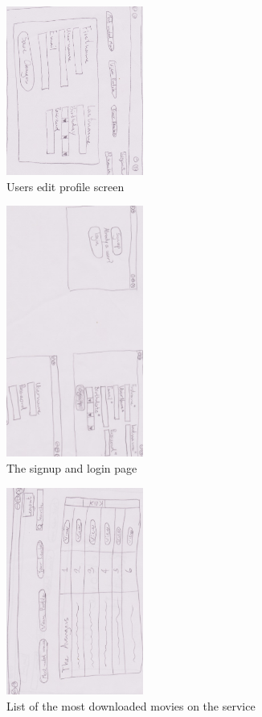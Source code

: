 \begin{figure}[!ht]
  \centering
    \includegraphics[angle=90, width=0.4\textwidth]{Parts/Appendix/Images/PaperMockup/EditProfile}
  \caption{Users edit profile screen}
  \label{fig:Appendix_GUI_sketches_EditProfile}
\end{figure}
\begin{figure}[!ht]
  \centering
    \includegraphics[angle=90, width=0.4\textwidth]{Parts/Appendix/Images/PaperMockup/LoginSignup}
  \caption{The signup and login page}
  \label{fig:Appendix_GUI_sketches_LoginSignup}
\end{figure}
\begin{figure}[!ht]
  \centering
    \includegraphics[angle=90, width=0.4\textwidth]{Parts/Appendix/Images/PaperMockup/MostDownloaded}
  \caption{List of the most downloaded movies on the service}
  \label{fig:Appendix_GUI_sketches_MostDownloaded}
\end{figure}
